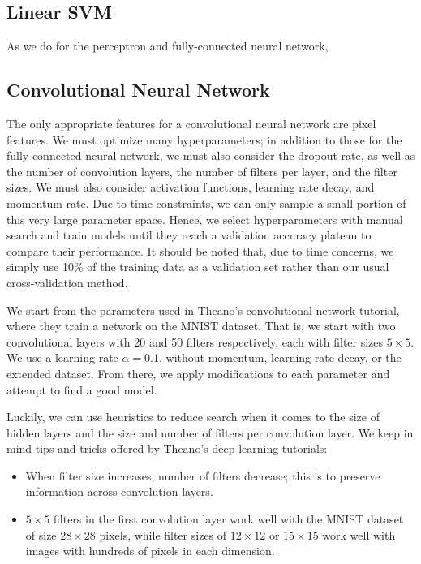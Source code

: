 \documentclass{acm_proc_article-sp}
\begin{document}
\subsection{Linear SVM}
As we do for the perceptron and fully-connected neural network, 


\subsection{Convolutional Neural Network}
The only appropriate features for a convolutional neural network are pixel features. We must optimize many hyperparameters; in addition to those for the fully-connected neural network, we must also consider the dropout rate, as well as the number of convolution layers, the number of filters per layer, and the filter sizes. We must also consider activation functions, learning rate decay, and momentum rate. Due to time constraints, we can only sample a small portion of this very large parameter space. Hence, we select hyperparameters with manual search and train models until they reach a validation accuracy plateau to compare their performance. It should be noted that, due to time concerns, we simply use 10\% of the training data as a validation set rather than our usual cross-validation method.

We start from the parameters used in Theano's convolutional network tutorial, where they train a network on the MNIST dataset. That is, we start with two convolutional layers with 20 and 50 filters respectively, each with filter sizes $5\times 5$. We use a learning rate $\alpha = 0.1$, without momentum, learning rate decay, or the extended dataset. From there, we apply modifications to each parameter and attempt to find a good model.

Luckily, we can use heuristics to reduce search when it comes to the size of hidden layers and the size and number of filters per convolution layer. We keep in mind tips and tricks offered by Theano's deep learning tutorials\cite{Theano-tut}:
\begin{itemize}
\item When filter size increases, number of filters decrease; this is to preserve information across convolution layers. 
\item $5 \times 5$ filters in the first convolution layer work well with the MNIST dataset of size $28 \times 28$ pixels, while filter sizes of $12\times12$ or $15\times15$ work well with images with hundreds of pixels in each dimension.
\end{itemize}
\end{document}
